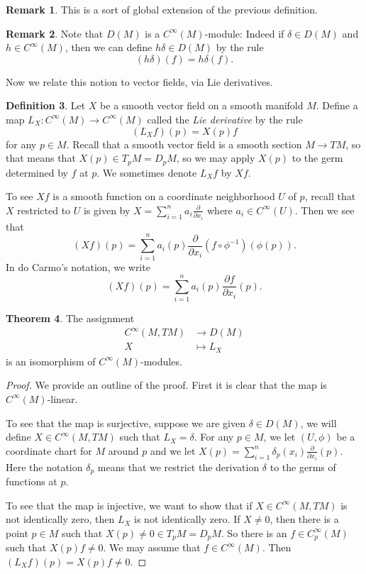 \documentclass{amsart}
\numberwithin{equation}{section}
\theoremstyle{definition}
\newtheorem{definition}{Definition} [section]
\newtheorem{remark}[definition]{Remark}
\theoremstyle{theorem}
\newtheorem{theorem}[definition]{Theorem}
\begin{document}
\begin{remark}
This is a sort of global extension of the previous definition. 
\end{remark}

\begin{remark}
Note that $D(M)$ is a $C^\infty(M)$-module: Indeed if $\delta \in D(M)$ and $h \in C^\infty(M)$, then we can define $h \delta \in D(M)$ by the rule 
\[
(h\delta)(f) = h \delta(f).
\]
\end{remark}

Now we relate this notion to vector fields, via Lie derivatives. 

\begin{definition}
Let $X$ be a smooth vector field on a smooth manifold $M$. Define a map $L_X : C^\infty(M) \to C^\infty(M)$ called the {\em Lie derivative} by the rule 
\[
(L_Xf)(p) = X(p)f
\]
for any $p \in M$. Recall that a smooth vector field is a smooth section $M \to TM$, so that means that $X(p) \in T_pM = D_pM$, so we may apply $X(p)$ to the germ determined by $f$ at $p$. We sometimes denote $L_Xf$ by $Xf$. 
\end{definition}

To see $Xf$ is a smooth function on a coordinate neighborhood $U$ of $p$, recall that $X$ restricted to $U$ is given by $X = \sum_{i=1}^n a_i \frac{\partial}{\partial x_i}$ where $a_i \in C^\infty(U)$. Then we see that 
\[
(Xf)(p) = \sum_{i=1}^n a_i(p) \frac{\partial }{\partial x_i}(f \circ \phi^{-1})(\phi(p)).
\]
In do Carmo's notation, we write 
\[
(Xf)(p) = \sum_{i=1}^n a_i(p) \frac{\partial f}{\partial x_i}(p).
\]



\begin{theorem}
The assignment 
\begin{align*}
C^\infty(M,TM) &\to D(M) \\
X &\mapsto L_X
\end{align*}
is an isomorphism of $C^\infty(M)$-modules. 
\end{theorem}

\begin{proof}
We provide an outline of the proof. First it is clear that the map is $C^\infty(M)$-linear. 

To see that the map is surjective, suppose we are given $\delta \in D(M)$, we will define $X \in C^\infty(M,TM)$ such that $L_X = \delta$. For any $p \in M$, we let $(U,\phi)$ be a coordinate chart for $M$ around $p$ and we let $X(p) = \sum_{i=1}^n \delta_p(x_i) \frac{\partial}{\partial x_i}(p)$. Here the notation $\delta_p$ means that we restrict the derivation $\delta$ to the germs of functions at $p$. 

To see that the map is injective, we want to show that if $X \in C^\infty(M,TM)$ is not identically zero, then $L_X$ is not identically zero.  If $X \ne 0$, then there is a point $p \in M$ such that $X(p) \ne 0 \in T_pM = D_pM$. So there is an $f \in C^\infty_p(M)$ such that $X(p)f \ne 0$. We may assume that $f \in C^\infty(M)$. Then $(L_Xf)(p) = X(p)f \ne 0$. 
\end{proof}
\end{document}
